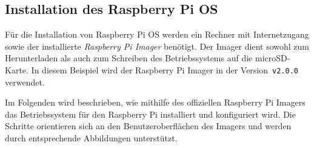 \subsection{Installation des Raspberry Pi OS}	
	Für die Installation von Raspberry Pi OS werden ein Rechner mit Internetzugang sowie der installierte \textit{Raspberry Pi Imager} benötigt. Der Imager dient sowohl zum Herunterladen als auch zum Schreiben des Betriebssystems auf die microSD-Karte. In diesem Beispiel wird der Raspberry Pi Imager in der Version~\texttt{v2.0.0} verwendet.
	

		
	Im Folgenden wird beschrieben, wie mithilfe des offiziellen Raspberry Pi Imagers das Betriebssystem für den Raspberry Pi installiert und konfiguriert wird. Die Schritte orientieren sich an den Benutzeroberflächen des Imagers und werden durch entsprechende Abbildungen unterstützt.
	
